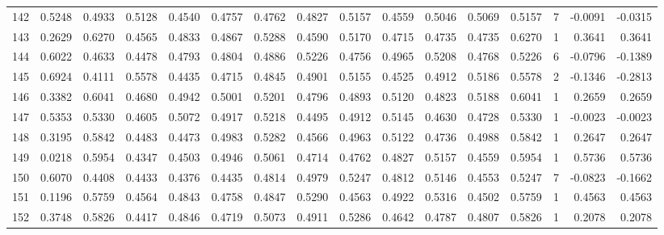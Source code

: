 \begin{tabular}{lrrrrrrrrrrrrrrr}
142 &      0.5248 &  0.4933 &  0.5128 &  0.4540 &  0.4757 &  0.4762 &  0.4827 &  0.5157 &  0.4559 &  0.5046 &   0.5069 &     0.5157 &      7 &                   -0.0091 &                    -0.0315 \\
143 &      0.2629 &  0.6270 &  0.4565 &  0.4833 &  0.4867 &  0.5288 &  0.4590 &  0.5170 &  0.4715 &  0.4735 &   0.4735 &     0.6270 &      1 &                    0.3641 &                     0.3641 \\
144 &      0.6022 &  0.4633 &  0.4478 &  0.4793 &  0.4804 &  0.4886 &  0.5226 &  0.4756 &  0.4965 &  0.5208 &   0.4768 &     0.5226 &      6 &                   -0.0796 &                    -0.1389 \\
145 &      0.6924 &  0.4111 &  0.5578 &  0.4435 &  0.4715 &  0.4845 &  0.4901 &  0.5155 &  0.4525 &  0.4912 &   0.5186 &     0.5578 &      2 &                   -0.1346 &                    -0.2813 \\
146 &      0.3382 &  0.6041 &  0.4680 &  0.4942 &  0.5001 &  0.5201 &  0.4796 &  0.4893 &  0.5120 &  0.4823 &   0.5188 &     0.6041 &      1 &                    0.2659 &                     0.2659 \\
147 &      0.5353 &  0.5330 &  0.4605 &  0.5072 &  0.4917 &  0.5218 &  0.4495 &  0.4912 &  0.5145 &  0.4630 &   0.4728 &     0.5330 &      1 &                   -0.0023 &                    -0.0023 \\
148 &      0.3195 &  0.5842 &  0.4483 &  0.4473 &  0.4983 &  0.5282 &  0.4566 &  0.4963 &  0.5122 &  0.4736 &   0.4988 &     0.5842 &      1 &                    0.2647 &                     0.2647 \\
149 &      0.0218 &  0.5954 &  0.4347 &  0.4503 &  0.4946 &  0.5061 &  0.4714 &  0.4762 &  0.4827 &  0.5157 &   0.4559 &     0.5954 &      1 &                    0.5736 &                     0.5736 \\
150 &      0.6070 &  0.4408 &  0.4433 &  0.4376 &  0.4435 &  0.4814 &  0.4979 &  0.5247 &  0.4812 &  0.5146 &   0.4553 &     0.5247 &      7 &                   -0.0823 &                    -0.1662 \\
151 &      0.1196 &  0.5759 &  0.4564 &  0.4843 &  0.4758 &  0.4847 &  0.5290 &  0.4563 &  0.4922 &  0.5316 &   0.4502 &     0.5759 &      1 &                    0.4563 &                     0.4563 \\
152 &      0.3748 &  0.5826 &  0.4417 &  0.4846 &  0.4719 &  0.5073 &  0.4911 &  0.5286 &  0.4642 &  0.4787 &   0.4807 &     0.5826 &      1 &                    0.2078 &                     0.2078 \\

\end{tabular}
